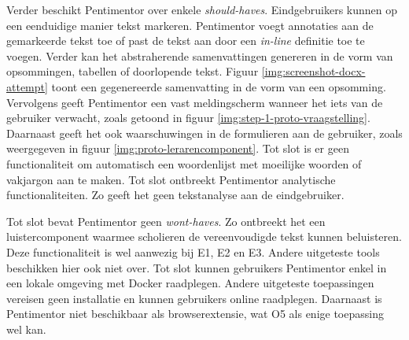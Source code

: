 Verder beschikt Pentimentor over enkele \textit{should-haves}. Eindgebruikers kunnen op een eenduidige manier tekst markeren. Pentimentor voegt annotaties aan de gemarkeerde tekst toe of past de tekst aan door een \textit{in-line} definitie toe te voegen. Verder kan het abstraherende samenvattingen genereren in de vorm van opsommingen, tabellen of doorlopende tekst. Figuur \ref{img:screenshot-docx-attempt} toont een gegenereerde samenvatting in de vorm van een opsomming. Vervolgens geeft Pentimentor een vast meldingscherm wanneer het iets van de gebruiker verwacht, zoals getoond in figuur \ref{img:step-1-proto-vraagstelling}. Daarnaast geeft het ook waarschuwingen in de formulieren aan de gebruiker, zoals weergegeven in figuur \ref{img:proto-lerarencomponent}. Tot slot is er geen functionaliteit om automatisch een woordenlijst met moeilijke woorden of vakjargon aan te maken. Tot slot ontbreekt Pentimentor analytische functionaliteiten. Zo geeft het geen tekstanalyse aan de eindgebruiker. 

\medspace

Tot slot bevat Pentimentor geen \textit{wont-haves}. Zo ontbreekt het een luistercomponent waarmee scholieren de vereenvoudigde tekst kunnen beluisteren. Deze functionaliteit is wel aanwezig bij E1, E2 en E3. Andere uitgeteste tools beschikken hier ook niet over. Tot slot kunnen gebruikers Pentimentor enkel in een lokale omgeving met Docker raadplegen. Andere uitgeteste toepassingen vereisen geen installatie en kunnen gebruikers online raadplegen. Daarnaast is Pentimentor niet beschikbaar als browserextensie, wat O5 als enige toepassing wel kan.